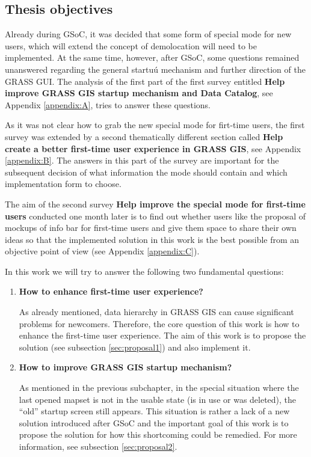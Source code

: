 \documentclass[a4paper,10pt,twoside]{article}
\begin{document}
\newpage
\vspace*{-1cm}
\subsection{Thesis objectives}

Already during GSoC, it was decided that some form of special mode for new users, which will extend the concept of demolocation will need to be implemented. At the same time, however, after GSoC, some questions remained unanswered regarding the general startuú mechanism and further direction of the GRASS GUI. The analysis of the first part of the first survey entitled \textbf {Help improve GRASS GIS startup mechanism and Data Catalog}, see Appendix \ref{appendix:A}, tries to answer these questions.

As it was not clear how to grab the new special mode for firt-time users, the first survey was extended by a second thematically different section called \textbf{Help create a better first-time user experience in GRASS GIS}, see Appendix \ref{appendix:B}. The answers in this part of the survey are important for the subsequent decision of what information the mode should contain and which implementation form to choose.

The aim of the second survey \textbf{Help improve the special mode for first-time users} conducted one month later is to find out whether users like the proposal of mockups of info bar for first-time users and give them space to share their own ideas so that the implemented solution in this work is the best possible from an objective point of view  (see Appendix \ref{appendix:C}).

\noindent In this work we will try to answer the following two fundamental questions:

\begin{enumerate}

\item  \noindent \textbf{How to enhance first-time user experience?}

\noindent As already mentioned, data hierarchy in GRASS GIS can cause significant problems for newcomers. Therefore, the core question of this work is how to enhance the first-time user experience. The aim of this work is to propose the solution (see subsection \ref{sec:proposal1})  and also implement it.


\item \noindent \textbf{How to improve GRASS GIS startup mechanism?}

As mentioned in the previous subchapter, in the special situation where the last opened mapset is not in the usable state (is in use or was deleted), the ``old'' startup screen still appears. This situation is rather a lack of a new solution introduced after GSoC and the important goal of this work is to propose the solution for how this shortcoming could be remedied. For more information, see subsection \ref{sec:proposal2}.

\end{enumerate}
\end{document}
